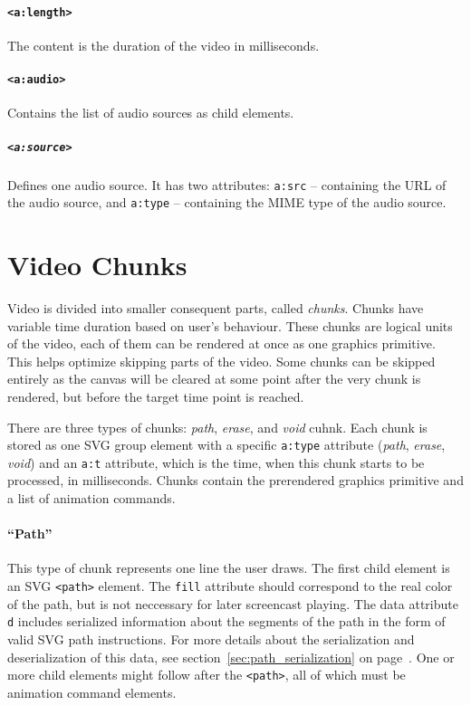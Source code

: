 \paragraph{\texttt{\textless a:length\textgreater}}
The content is the duration of the video in milliseconds.

\paragraph{\texttt{\textless a:audio\textgreater}}
Contains the list of audio sources as child elements.

\subparagraph{\texttt{\textless a:source\textgreater}}
Defines one audio source. It has two attributes: \verb|a:src| -- containing the URL of the audio source, and \verb|a:type| -- containing the MIME type of the audio source.

\section{Video Chunks}
Video is divided into smaller consequent parts, called \textit{chunks}. Chunks have variable time duration based on user's behaviour. These chunks are logical units of the video, each of them can be rendered at once as one graphics primitive. This helps optimize skipping parts of the video. Some chunks can be skipped entirely as the canvas will be cleared at some point after the very chunk is rendered, but before the target time point is reached.

There are three types of chunks: \textit{path}, \textit{erase}, and \textit{void} cuhnk. Each chunk is stored as one SVG group element with a specific \verb|a:type| attribute (\textit{path}, \textit{erase}, \textit{void}) and an \verb|a:t| attribute, which is the time, when this chunk starts to be processed, in milliseconds. Chunks contain the prerendered graphics primitive and a list of animation commands.

\paragraph{``Path''}
This type of chunk represents one line the user draws. The first child element is an SVG \verb|<path>| element. The \verb|fill| attribute should correspond to the real color of the path, but is not neccessary for later screencast playing. The data attribute \verb|d| includes serialized information about the segments of the path in the form of valid SVG path instructions. For more details about the serialization and deserialization of this data, see section~\ref{sec:path_serialization} on page~\pageref{sec:path_serialization}. One or more child elements might follow after the \verb|<path>|, all of which must be animation command elements.

